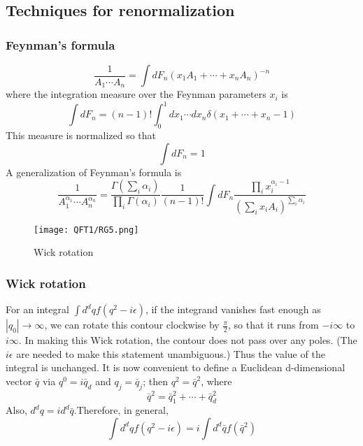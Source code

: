 \subsection{Techniques for renormalization}
\subsubsection{Feynman's formula}
\begin{newthem}
\[ \frac{1}{A_1 \cdots A_n} = \int dF_n (x_1A_1+ \cdots +x_nA_n)^{-n}\]
where the integration measure over the Feynman parameters $x_i$ is
\[\int dF_n = (n-1)! \int_0^1 dx_1 \cdots dx_n \delta(x_1+\cdots+x_n-1)\]
This measure is normalized so that
\[\int dF_n = 1\]
A generalization of Feynman's formula is
\[ \frac{1}{A_1^{\alpha_1} \cdots A_n^{\alpha_n}} = \frac{\Gamma(\sum_i \alpha_i)}{\prod_i \Gamma(\alpha_i)} \frac{1}{(n-1)!}\int dF_n \frac{\prod_i x_i^{\alpha_i-1}}{(\sum_i x_i A_i)^{\sum_i \alpha_i}}\]
\end{newthem}
\begin{figure}[!h]
\centering
\texttt{[image: QFT1/RG5.png]}
\caption{Wick rotation}
\end{figure}

\subsubsection{Wick rotation}
For an integral $\int d^d q f(q^2-i\epsilon)$, if the integrand vanishes fast enough as $|q_0| \to \infty$, we can rotate this contour clockwise by $\frac{\pi}{2}$, so that it runs from $-i\infty$ to $i\infty$. In making this Wick rotation, the contour does not pass over any poles. (The $i\epsilon$ are needed to make this statement unambiguous.) Thus the value of the integral is unchanged. It is now convenient to define a Euclidean d-dimensional vector $\bar{q}$ via $q^0 = i \bar{q}_d$ and $q_j = \bar{q}_j$; then $q^2 = \bar{q}^2$, where
\[\bar{q}^2 = \bar{q}_1^2 + \cdots + \bar{q}_d^2\]
Also, $d^dq = id^d \bar{q}$.Therefore, in general,
\[\int d^d q f(q^2-i\epsilon) = i \int d^d\bar{q} f(\bar{q}^2)\]

